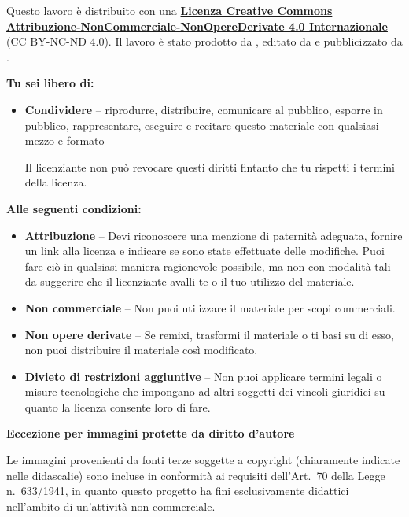 {    Questo lavoro è distribuito con una \href{https://creativecommons.org/licenses/by-nc-nd/4.0/deed.it}{\textbf{Licenza Creative Commons Attribuzione-NonCommerciale-NonOpereDerivate 4.0 Internazionale}} (CC BY-NC-ND 4.0).
    Il lavoro è stato prodotto da \DDauthors\ifx\DDeditors\empty\else, editato da \DDeditors\fi{} e pubblicizzato da \DDorganization.

    \textbf{Tu sei libero di:}
    \begin{itemize}
        \item \textbf{Condividere} -- riprodurre, distribuire, comunicare al pubblico, esporre in pubblico, rappresentare, eseguire e recitare questo materiale con qualsiasi mezzo e formato

        Il licenziante non può revocare questi diritti fintanto che tu rispetti i termini della licenza.
    \end{itemize}

    \textbf{Alle seguenti condizioni:}
    \begin{itemize}
        \item \textbf{Attribuzione} -- Devi riconoscere una menzione di paternità adeguata, fornire un link alla licenza e indicare se sono state effettuate delle modifiche. Puoi fare ciò in qualsiasi maniera ragionevole possibile, ma non con modalità tali da suggerire che il licenziante avalli te o il tuo utilizzo del materiale.
        \item \textbf{Non commerciale} -- Non puoi utilizzare il materiale per scopi commerciali.
        \item \textbf{Non opere derivate} -- Se remixi, trasformi il materiale o ti basi su di esso, non puoi distribuire il materiale così modificato.
        \item \textbf{Divieto di restrizioni aggiuntive} -- Non puoi applicare termini legali o misure tecnologiche che impongano ad altri soggetti dei vincoli giuridici su quanto la licenza consente loro di fare.
    \end{itemize}

    \vspace{0.6cm}
    {\large\textbf{Eccezione per immagini protette da diritto d'autore}}

    Le immagini provenienti da fonti terze soggette a copyright (chiaramente indicate nelle didascalie) sono incluse in conformità ai requisiti dell'Art.\!~70 della Legge n.\!~633/1941, in quanto questo progetto ha fini esclusivamente didattici nell'ambito di un'attività non commerciale.

}
